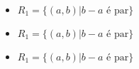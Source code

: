 \begin{question}
	\begin{itemize}
		\item $R_1 = \{ (a,b) | b -a \text{ é par} \}$
		\item $R_1 = \{ (a,b) | b -a \text{ é par} \}$
		\item $R_1 = \{ (a,b) | b -a \text{ é par} \}$
	\end{itemize}
\end{question}

\newpage